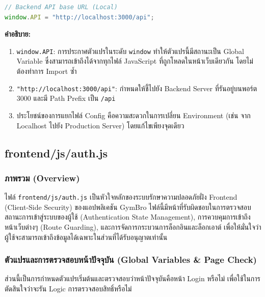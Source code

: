 \begin{lstlisting}[language=JavaScript, caption={การกำหนดค่า API Base URL ใน frontend/js/config.js}, label={code:frontend-js-config}]
// Backend API base URL (Local)
window.API = "http://localhost:3000/api";
\end{lstlisting}

\textbf{คำอธิบาย:}
\begin{enumerate}
    \item \texttt{window.API}: การประกาศตัวแปรในระดับ \texttt{window} ทำให้ตัวแปรนี้มีสถานะเป็น Global Variable ซึ่งสามารถเข้าถึงได้จากทุกไฟล์ JavaScript ที่ถูกโหลดในหน้าเว็บเดียวกัน โดยไม่ต้องทำการ Import ซ้ำ
    \item \texttt{"http://localhost:3000/api"}: กำหนดให้ชี้ไปยัง Backend Server ที่รันอยู่บนพอร์ต 3000 และมี Path Prefix เป็น \texttt{/api}
    \item ประโยชน์ของการแยกไฟล์ Config คือความสะดวกในการเปลี่ยน Environment (เช่น จาก Localhost ไปยัง Production Server) โดยแก้ไขเพียงจุดเดียว
\end{enumerate}


\subsection{frontend/js/auth.js}

\subsubsection{ภาพรวม (Overview)}
\begin{sloppypar}
ไฟล์ \texttt{frontend/js/auth.js} เป็นหัวใจหลักของระบบรักษาความปลอดภัยฝั่ง Frontend (Client-Side Security) ของแอปพลิเคชัน GymBro ไฟล์นี้มีหน้าที่รับผิดชอบในการตรวจสอบสถานะการเข้าสู่ระบบของผู้ใช้ (Authentication State Management), การควบคุมการเข้าถึงหน้าเว็บต่างๆ (Route Guarding), และการจัดการกระบวนการล็อกอินและล็อกเอาต์ เพื่อให้มั่นใจว่าผู้ใช้จะสามารถเข้าถึงข้อมูลได้เฉพาะในส่วนที่ได้รับอนุญาตเท่านั้น
\end{sloppypar}

\subsubsection{ตัวแปรและการตรวจสอบหน้าปัจจุบัน (Global Variables \& Page Check)}
ส่วนนี้เป็นการกำหนดตัวแปรเริ่มต้นและตรวจสอบว่าหน้าปัจจุบันคือหน้า Login หรือไม่ เพื่อใช้ในการตัดสินใจว่าจะรัน Logic การตรวจสอบสิทธิ์หรือไม่

